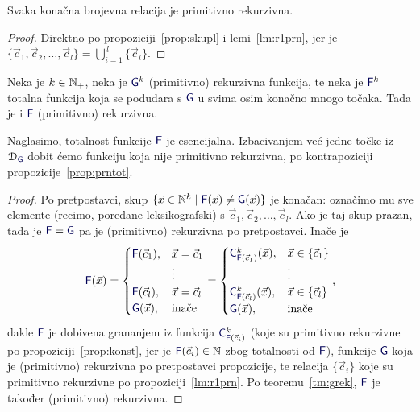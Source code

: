 \begin{korolar}\label{kor:konprn}
Svaka konačna brojevna relacija je primitivno rekurzivna.
\end{korolar}
\begin{proof}
Direktno po propoziciji~\ref{prop:skupl} i lemi~\ref{lm:r1prn}, jer je $\{\vec c_1,\vec c_2,\dotsc,\vec c_l\}=\bigcup_{i=1}^{\,l}\{\vec c_i\}$.
\end{proof}

\begin{propozicija}\label{prop:konprom}
Neka je $k\in{\mathbb N}_+$, neka je $\f G^k$ (primitivno) rekurzivna funkcija, te neka je $\f F^k$ totalna funkcija koja se podudara s $\f G$ u svima osim konačno mnogo točaka. Tada je i $\f F$ (primitivno) rekurzivna.
\end{propozicija}
Naglasimo, totalnost funkcije $\f F$ je esencijalna. Izbacivanjem već jedne točke iz $\dom{\f G}$ dobit ćemo funkciju koja nije primitivno rekurzivna, po kontrapoziciji propozicije~\ref{prop:prntot}.
\begin{proof}
    Po pretpostavci, skup $\{\vec x\in\N^k\mid\f F(\vec x)\not=\f G(\vec x)\}$ je konačan: označimo mu sve elemente (recimo, poredane leksikografski) s $\vec c_1,\vec c_2,\dotsc,\vec c_l$. Ako je taj skup prazan, tada je $\f F=\f G$ pa je (primitivno) rekurzivna po pretpostavci. Inače je
\begin{equation}
    \f F(\vec x)=\begin{cases}
    \f F(\vec c_1),&\vec x=\vec c_1\\
    &\vdots\\
    \f F(\vec c_l),&\vec x=\vec c_l\\
    \f G(\vec x),&\text{inače}
    \end{cases}=\begin{cases}
    \f C^k_{\f F(\vec c_1)}(\vec x),&\vec x\in\{\vec c_1\}\\
    &\vdots\\
    \f C^k_{\f F(\vec c_l)}(\vec x),&\vec x\in\{\vec c_l\}\\
    \f G(\vec x),&\text{inače}
    \end{cases}\text,
\end{equation}
dakle $\f F$ je dobivena grananjem iz funkcija $\f C^k_{\f F(\vec c_i)}$ (koje su primitivno rekurzivne po propoziciji~\ref{prop:konst}, jer je $\f F(\vec c_i)\in\N$ zbog totalnosti od $\f F$), funkcije $\f G$ koja je (primitivno) rekurzivna po pretpostavci propozicije, te relacija $\{\vec c_i\}$ koje su primitivno rekurzivne po propoziciji~\ref{lm:r1prn}. Po teoremu~\ref{tm:grek}, $\f F$ je također (primitivno) rekurzivna.
\end{proof}

